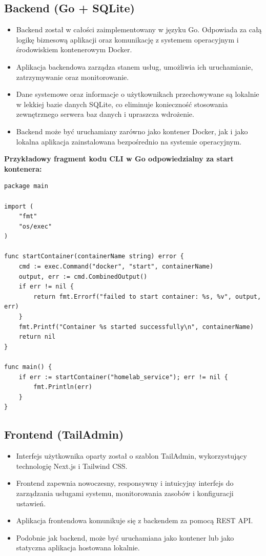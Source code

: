 \subsection{Backend (Go + SQLite)}
\begin{itemize}
    \item Backend został w całości zaimplementowany w języku Go. Odpowiada za całą logikę biznesową aplikacji oraz komunikację z systemem operacyjnym i środowiskiem kontenerowym Docker.
    \item Aplikacja backendowa zarządza stanem usług, umożliwia ich uruchamianie, zatrzymywanie oraz monitorowanie.
    \item Dane systemowe oraz informacje o użytkownikach przechowywane są lokalnie w lekkiej bazie danych SQLite, co eliminuje konieczność stosowania zewnętrznego serwera baz danych i upraszcza wdrożenie.
    \item Backend może być uruchamiany zarówno jako kontener Docker, jak i jako lokalna aplikacja zainstalowana bezpośrednio na systemie operacyjnym.
\end{itemize}

\textbf{Przykładowy fragment kodu CLI w Go odpowiedzialny za start kontenera:}
\begin{verbatim}
package main

import (
    "fmt"
    "os/exec"
)

func startContainer(containerName string) error {
    cmd := exec.Command("docker", "start", containerName)
    output, err := cmd.CombinedOutput()
    if err != nil {
        return fmt.Errorf("failed to start container: %s, %v", output, err)
    }
    fmt.Printf("Container %s started successfully\n", containerName)
    return nil
}

func main() {
    if err := startContainer("homelab_service"); err != nil {
        fmt.Println(err)
    }
}
\end{verbatim}

\subsection{Frontend (TailAdmin)}
\begin{itemize}
    \item Interfejs użytkownika oparty został o szablon TailAdmin, wykorzystujący technologię Next.js i Tailwind CSS.
    \item Frontend zapewnia nowoczesny, responsywny i intuicyjny interfejs do zarządzania usługami systemu, monitorowania zasobów i konfiguracji ustawień.
    \item Aplikacja frontendowa komunikuje się z backendem za pomocą REST API.
    \item Podobnie jak backend, może być uruchamiana jako kontener lub jako statyczna aplikacja hostowana lokalnie.
\end{itemize}

